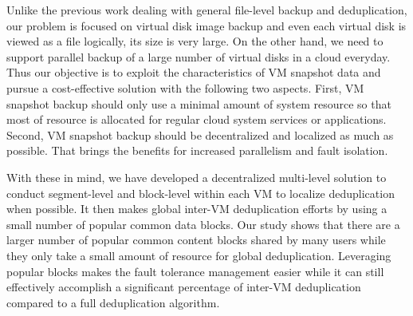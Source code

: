 Unlike the previous work dealing with general file-level backup and deduplication, our problem is focused on 
virtual disk image backup and even each virtual disk is viewed as a file logically, its size is very large.
On the other hand, we need to support parallel backup of a large number of virtual disks in a cloud everyday. 
Thus our objective is to exploit the characteristics of VM snapshot data and
pursue a cost-effective solution with the following two aspects.
First,   VM snapshot backup should only use a minimal amount of system
resource so that most of resource is allocated for regular cloud system services or applications.
Second, VM snapshot backup should be  decentralized and localized as much as possible.
That brings the benefits for increased parallelism  and fault isolation. 

With these in mind, we  have developed a decentralized multi-level solution to conduct 
segment-level  and block-level  within each VM to localize deduplication when possible.
It then makes global inter-VM deduplication efforts by using a small number of
popular common data blocks.  Our study shows that there are a larger number
of popular common content  blocks shared by many users while they only take
a small amount of resource for global deduplication. 
Leveraging popular blocks makes the fault tolerance management easier while
it can still effectively accomplish a significant percentage of inter-VM  deduplication
compared to a full deduplication algorithm. 


